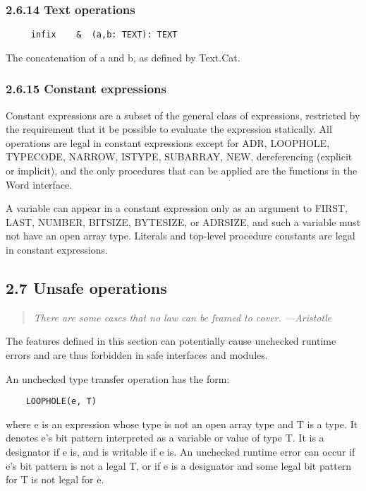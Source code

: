 \documentclass[10pt]{article}
\begin{document}
 
\subsubsection*{2.6.14 Text operations}


 
\begin{verbatim}
     infix    &  (a,b: TEXT): TEXT
\end{verbatim}
 The concatenation of a and b, as defined by Text.Cat. 


 
\subsubsection*{2.6.15 Constant expressions}


  Constant expressions are a subset of the general class of expressions, restricted by the requirement that it be possible to evaluate the expression statically. All operations are legal in constant expressions except for ADR, LOOPHOLE, TYPECODE, NARROW, ISTYPE, SUBARRAY, NEW, dereferencing (explicit or implicit), and the only procedures that can be applied are the functions in the Word interface. 


  A variable can appear in a constant expression only as an argument to FIRST, LAST, NUMBER, BITSIZE, BYTESIZE, or ADRSIZE, and such a variable must not have an open array type. Literals and top-level procedure constants are legal in constant expressions. 


 
\subsection*{2.7 Unsafe operations}


 
\begin{quote}
\emph{ There are some cases that no law can be framed to cover. ---Aristotle }
\end{quote}



 The features defined in this section can potentially cause unchecked runtime errors and are thus forbidden in safe interfaces and modules. 


 An unchecked type transfer operation has the form: 
\begin{verbatim}
    LOOPHOLE(e, T)
\end{verbatim}
 where e is an expression whose type is not an open array type and T is a type. It denotes e's bit pattern interpreted as a variable or value of type T. It is a designator if e is, and is writable if e is. An unchecked runtime error can occur if e's bit pattern is not a legal T, or if e is a designator and some legal bit pattern for T is not legal for e. 
\end{document}

